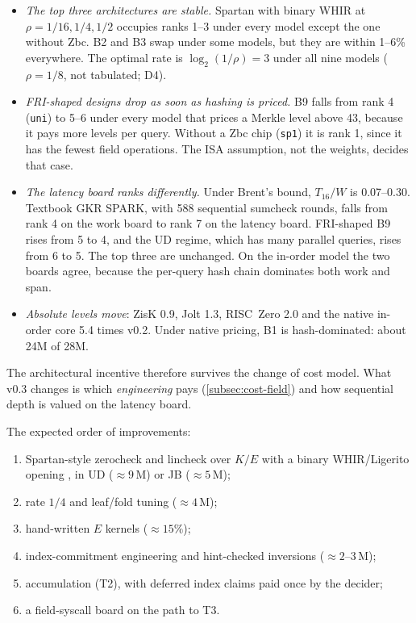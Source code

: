 \begin{itemize}[nosep]
\item \emph{The top three architectures are stable.} Spartan with binary WHIR at $\rho=1/16,1/4,1/2$
  occupies ranks 1--3 under every model except the one without Zbc. B2 and B3 swap under some models,
  but they are within 1--6\% everywhere. The optimal rate is $\log_2(1/\rho)=3$ under all nine
  models ($\rho=1/8$, not tabulated; D4).
\item \emph{FRI-shaped designs drop as soon as hashing is priced.} B9 falls from rank 4 (\texttt{uni})
  to 5--6 under every model that prices a Merkle level above 43, because it pays more levels per query.
  Without a Zbc chip (\texttt{sp1}) it is rank 1, since it has the fewest field operations. The ISA
  assumption, not the weights, decides that case.
\item \emph{The latency board ranks differently.} Under Brent's bound, $T_{16}/W$ is 0.07--0.30.
  Textbook GKR SPARK, with 588 sequential sumcheck rounds, falls from rank 4 on the work board to
  rank 7 on the latency board. FRI-shaped B9 rises from 5 to 4, and the UD regime, which has many
  parallel queries, rises from 6 to 5. The top three are unchanged. On the in-order model the two
  boards agree, because the per-query hash chain dominates both work and span.
\item \emph{Absolute levels move}: ZisK 0.9, Jolt 1.3, RISC~Zero 2.0 and the native in-order core 5.4
  times v0.2. Under native pricing, B1 is hash-dominated: about 24M of 28M.
\end{itemize}
The architectural incentive therefore survives the change of cost model. What v0.3 changes is which
\emph{engineering} pays (\cref{subsec:cost-field}) and how sequential depth is valued on the latency
board.

The expected order of improvements:
\begin{enumerate}[nosep]
\item Spartan-style zerocheck and lincheck over $K/E$ with a binary WHIR/Ligerito opening
  \cite{Set20-Spartan,ACFY24-WHIR,NA25-Ligerito}, in UD ($\approx9$\,M) or JB ($\approx5$\,M);
\item rate $1/4$ and leaf/fold tuning ($\approx4$\,M);
\item hand-written $E$ kernels ($\approx15\%$);
\item index-commitment engineering and hint-checked inversions ($\approx2$--$3$\,M);
\item accumulation (T2), with deferred index claims paid once by the decider;
\item a field-syscall board on the path to T3.
\end{enumerate}

